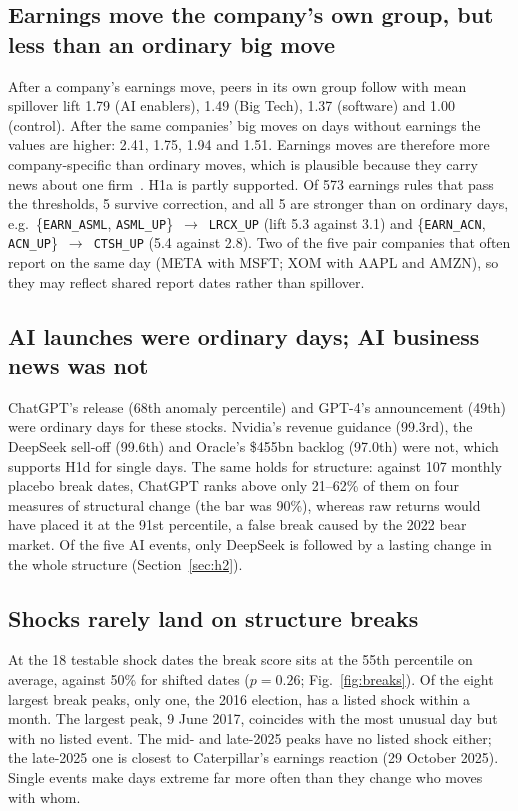 \documentclass[conference]{IEEEtran}
\begin{document}
\subsection{Earnings move the company's own group, but less than an ordinary big move}
After a company's earnings move, peers in its own group follow with mean spillover lift 1.79 (AI enablers), 1.49 (Big Tech), 1.37 (software) and 1.00 (control). After the same companies' big moves on days without earnings the values are higher: 2.41, 1.75, 1.94 and 1.51. Earnings moves are therefore more company-specific than ordinary moves, which is plausible because they carry news about one firm~\cite{foster1981}. H1a is partly supported. Of 573 earnings rules that pass the thresholds, 5 survive correction, and all 5 are stronger than on ordinary days, e.g.\ \{\texttt{EARN\_ASML}, \texttt{ASML\_UP}\}~$\rightarrow$~\texttt{LRCX\_UP} (lift 5.3 against 3.1) and \{\texttt{EARN\_ACN}, \texttt{ACN\_UP}\}~$\rightarrow$~\texttt{CTSH\_UP} (5.4 against 2.8). Two of the five pair companies that often report on the same day (META with MSFT; XOM with AAPL and AMZN), so they may reflect shared report dates rather than spillover.

\subsection{AI launches were ordinary days; AI business news was not}
ChatGPT's release (68th anomaly percentile) and GPT-4's announcement (49th) were ordinary days for these stocks. Nvidia's revenue guidance (99.3rd), the DeepSeek sell-off (99.6th) and Oracle's \$455bn backlog (97.0th) were not, which supports H1d for single days. The same holds for structure: against 107 monthly placebo break dates, ChatGPT ranks above only 21--62\% of them on four measures of structural change (the bar was 90\%), whereas raw returns would have placed it at the 91st percentile, a false break caused by the 2022 bear market. Of the five AI events, only DeepSeek is followed by a lasting change in the whole structure (Section~\ref{sec:h2}).

\subsection{Shocks rarely land on structure breaks}
At the 18 testable shock dates the break score sits at the 55th percentile on average, against 50\% for shifted dates ($p=0.26$; Fig.~\ref{fig:breaks}). Of the eight largest break peaks, only one, the 2016 election, has a listed shock within a month. The largest peak, 9 June 2017, coincides with the most unusual day but with no listed event. The mid- and late-2025 peaks have no listed shock either; the late-2025 one is closest to Caterpillar's earnings reaction (29 October 2025). Single events make days extreme far more often than they change who moves with whom.
\end{document}
